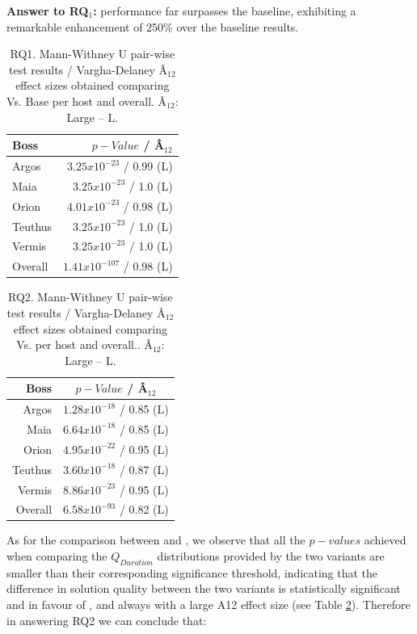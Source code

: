 \textbf{Answer to RQ$_1$:} \simhotep{} performance far surpasses the baseline, exhibiting a remarkable enhancement of 250\% over the baseline results.


\begin{table}[tb]
	\centering
	\caption{RQ1. Mann-Withney U pair-wise test results / Vargha-Delaney Â$_{12}$ effect sizes obtained comparing \simhotep{} Vs. Base per host and overall. Â$_{12}$: Large -- L.}
	\label{tab:resultsWilcEffRQ1}
	\begin{tabular}{@{}lr@{}}
		\toprule
		Boss    & $p-Value$ / Â$_{12}$           \\ \midrule 
		Argos   & $3.25x10^{-23}$  / 0.99 (L)    \\
		Maia    & $3.25x10^{-23}$  /  1.0 (L)    \\
		Orion   & $4.01x10^{-23}$  / 0.98 (L)    \\
		Teuthus & $3.25x10^{-23}$  /  1.0 (L)    \\
		Vermis  & $3.25x10^{-23}$  /  1.0 (L)    \\
		Overall & $1.41x10^{-107}$ / 0.98 (L)    \\
		\bottomrule
	\end{tabular}
\end{table}

\begin{table}[tb]
    \centering
    \caption{RQ2. Mann-Withney U pair-wise test results / Vargha-Delaney Â$_{12}$ effect sizes obtained comparing \simhotep{} Vs. \timhotep{} per host and overall.. Â$_{12}$: Large -- L.}
	\label{tab:resultsWilcEffRQ2}
    \begin{tabular}{@{}rc@{}}
    \toprule
    Boss    & $p-Value$ / Â$_{12}$           \\ \midrule 
    Argos   & $1.28x10^{-18}$ / 0.85 (L)     \\
    Maia    & $6.64x10^{-18}$ / 0.85 (L)     \\
    Orion   & $4.95x10^{-22}$ / 0.95 (L)     \\
    Teuthus & $3.60x10^{-18}$ / 0.87 (L)     \\
    Vermis  & $8.86x10^{-23}$ / 0.95 (L)     \\
    Overall & $6.58x10^{-93}$ / 0.82 (L)     \\
    \bottomrule
    \end{tabular}
    \end{table}
    
As for the comparison between \simhotep{} and \timhotep{},  we observe that all the $p-values$ achieved when comparing the $Q_{Duration}$ distributions provided by the two variants are smaller than their corresponding significance threshold, indicating that the difference in solution quality between the two variants is statistically significant and in favour of \simhotep{}, and always with a large A12 effect size (see Table \ref{tab:resultsWilcEffRQ2}). Therefore in answering RQ2 we can conclude that:

